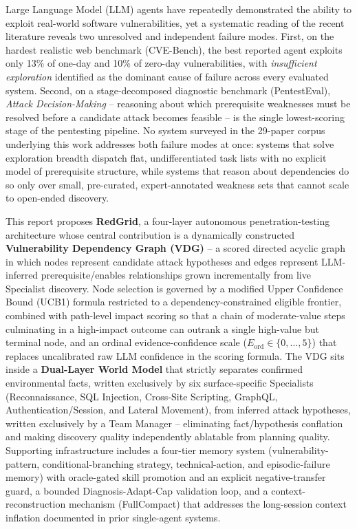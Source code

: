 \hspace{1cm} Large Language Model (LLM) agents have repeatedly demonstrated the ability to exploit real-world software vulnerabilities, yet a systematic reading of the recent literature reveals two unresolved and independent failure modes. First, on the hardest realistic web benchmark (CVE-Bench), the best reported agent exploits only 13\% of one-day and 10\% of zero-day vulnerabilities, with \emph{insufficient exploration} identified as the dominant cause of failure across every evaluated system. Second, on a stage-decomposed diagnostic benchmark (PentestEval), \emph{Attack Decision-Making} -- reasoning about which prerequisite weaknesses must be resolved before a candidate attack becomes feasible -- is the single lowest-scoring stage of the pentesting pipeline. No system surveyed in the 29-paper corpus underlying this work addresses both failure modes at once: systems that solve exploration breadth dispatch flat, undifferentiated task lists with no explicit model of prerequisite structure, while systems that reason about dependencies do so only over small, pre-curated, expert-annotated weakness sets that cannot scale to open-ended discovery.

\vspace{0.3cm}
\hspace{1cm} This report proposes \textbf{RedGrid}, a four-layer autonomous penetration-testing architecture whose central contribution is a dynamically constructed \textbf{Vulnerability Dependency Graph (VDG)} -- a scored directed acyclic graph in which nodes represent candidate attack hypotheses and edges represent LLM-inferred prerequisite/enables relationships grown incrementally from live Specialist discovery. Node selection is governed by a modified Upper Confidence Bound (UCB1) formula restricted to a dependency-constrained eligible frontier, combined with path-level impact scoring so that a chain of moderate-value steps culminating in a high-impact outcome can outrank a single high-value but terminal node, and an ordinal evidence-confidence scale ($E_{\mathrm{ord}} \in \{0,\ldots,5\}$) that replaces uncalibrated raw LLM confidence in the scoring formula. The VDG sits inside a \textbf{Dual-Layer World Model} that strictly separates confirmed environmental facts, written exclusively by six surface-specific Specialists (Reconnaissance, SQL Injection, Cross-Site Scripting, GraphQL, Authentication/Session, and Lateral Movement), from inferred attack hypotheses, written exclusively by a Team Manager -- eliminating fact/hypothesis conflation and making discovery quality independently ablatable from planning quality. Supporting infrastructure includes a four-tier memory system (vulnerability-pattern, conditional-branching strategy, technical-action, and episodic-failure memory) with oracle-gated skill promotion and an explicit negative-transfer guard, a bounded Diagnosis-Adapt-Cap validation loop, and a context-reconstruction mechanism (FullCompact) that addresses the long-session context inflation documented in prior single-agent systems.

